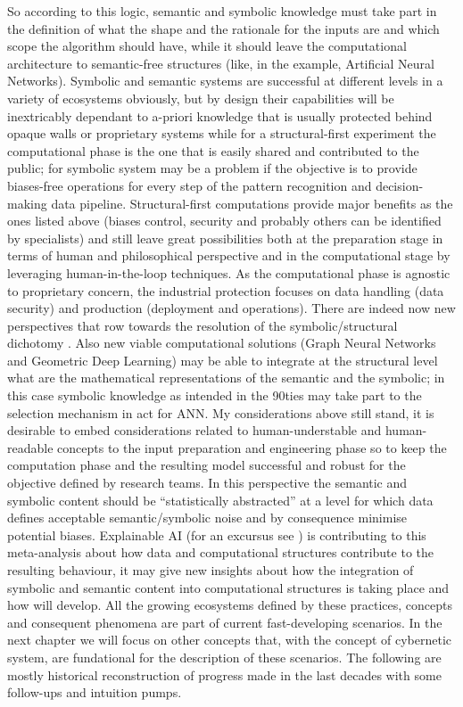 \documentclass[14pt]{extarticle}
\begin{document}
So according to this logic, semantic and symbolic knowledge must take part in the definition of what the shape and the rationale for the inputs are and which scope the algorithm should have, while it should leave the computational architecture to semantic-free structures (like, in the example, Artificial Neural Networks). Symbolic and semantic systems are successful at different levels in a variety of ecosystems obviously, but by design their capabilities will be inextricably dependant to a-priori knowledge that is usually protected behind opaque walls or proprietary systems while for a structural-first experiment the computational phase is the one that is easily shared and contributed to the public; for symbolic system may be a problem if the objective is to provide biases-free operations for every step of the pattern recognition and decision-making data pipeline. Structural-first computations provide major benefits as the ones listed above (biases control, security and probably others can be identified by specialists) and still leave great possibilities both at the preparation stage in terms of human and philosophical perspective and in the computational stage by leveraging human-in-the-loop techniques. As the computational phase is agnostic to proprietary concern, the industrial protection focuses on data handling (data security) and production (deployment and operations).
\newline
There are indeed now new perspectives that row towards the resolution of the symbolic/structural dichotomy \cite{Cheng2016,honavar1995}. Also new viable computational solutions (Graph Neural Networks and Geometric Deep Learning) may be able to integrate at the structural level what are the mathematical representations of the semantic and the symbolic; in this case symbolic knowledge as intended in the 90ties may take part to the selection mechanism in act for ANN. My considerations above still stand, it is desirable to embed considerations related to human-understable and human-readable concepts to the input preparation and engineering phase so to keep the computation phase and the resulting model successful and robust for the objective defined by research teams. In this perspective the semantic and symbolic content should be “statistically abstracted” at a level for which data defines acceptable semantic/symbolic noise and by consequence minimise potential biases. Explainable AI (for an excursus see \cite{savagebreaking}) is contributing to this meta-analysis about how data and computational structures contribute to the resulting behaviour, it may give new insights about how the integration of symbolic and semantic content into computational structures is taking place and how will develop.
\newline
All the growing ecosystems defined by these practices, concepts and consequent phenomena are part of current fast-developing scenarios. In the next chapter we will focus on other concepts that, with the concept of cybernetic system, are fundational for the description of these scenarios. The following are mostly historical reconstruction of progress made in the last decades with some follow-ups and intuition pumps.
\end{document}
